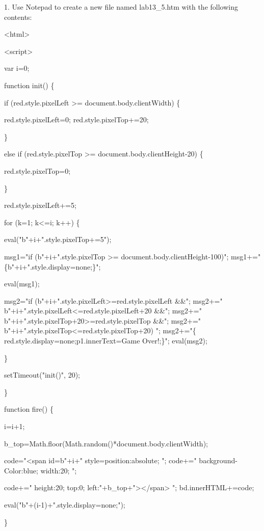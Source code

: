 \documentclass[
]{article}
\begin{document}
1. Use Notepad to create a new file named lab13\_5.htm with the
following contents:

\textless html\textgreater{}

\textless script\textgreater{}

var i=0;

function init() \{

if (red.style.pixelLeft \textgreater= document.body.clientWidth) \{

red.style.pixelLeft=0; red.style.pixelTop+=20;

\}

else if (red.style.pixelTop \textgreater= document.body.clientHeight-20)
\{

red.style.pixelTop=0;

\}

red.style.pixelLeft+=5;

for (k=1; k\textless=i; k++) \{

eval("b"+i+".style.pixelTop+=5");

msg1="if (b"+i+".style.pixelTop \textgreater=
document.body.clientHeight-100)"; msg1+="
\{b"+i+".style.display=\textquotesingle none\textquotesingle;\}";

eval(msg1);

msg2="if (b"+i+".style.pixelLeft\textgreater=red.style.pixelLeft \&\&";
msg2+=" b"+i+".style.pixelLeft\textless=red.style.pixelLeft+20 \&\&";
msg2+=" b"+i+".style.pixelTop+20\textgreater=red.style.pixelTop \&\&";
msg2+=" b"+i+".style.pixelTop\textless=red.style.pixelTop+20) ";
msg2+="\{
red.style.display=\textquotesingle none\textquotesingle;p1.innerText=\textquotesingle Game
Over!\textquotesingle;\}"; eval(msg2);

\}

setTimeout("init()", 20);

\}

function fire() \{

i=i+1;

b\_top=Math.floor(Math.random()*document.body.clientWidth);

code="\textless span id=\textquotesingle b"+i+"\textquotesingle{}
style=\textquotesingle position:absolute; "; code+="
background-Color:blue; width:20; ";

code+=" height:20; top:0;
left:"+b\_top+"\textquotesingle\textgreater\textless/span\textgreater{}
"; bd.innerHTML+=code;

eval("b"+(i-1)+".style.display=\textquotesingle none\textquotesingle;");

\}
\end{document}
